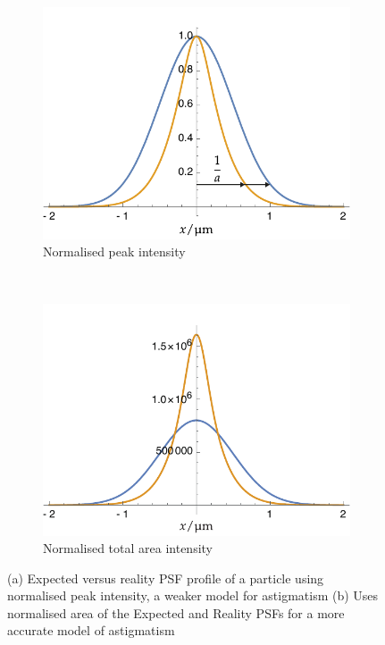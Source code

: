 \begin{figure}
    \centering
    \begin{subfigure}[t]{\linewidth}
        \centering
        \includegraphics{./mathematica/guassian_peak}
        \caption{Normalised peak intensity}
    \end{subfigure}\\
    \begin{subfigure}[t]{\linewidth}
        \centering
        \includegraphics{./mathematica/guassian_area}
        \caption{Normalised total area intensity}
    \end{subfigure}
  \caption{
  (a) Expected versus reality PSF profile of a particle using normalised peak intensity, a weaker model for astigmatism
  (b) Uses normalised area of the Expected and Reality PSFs for a more accurate model of astigmatism}\label{}
\end{figure}
